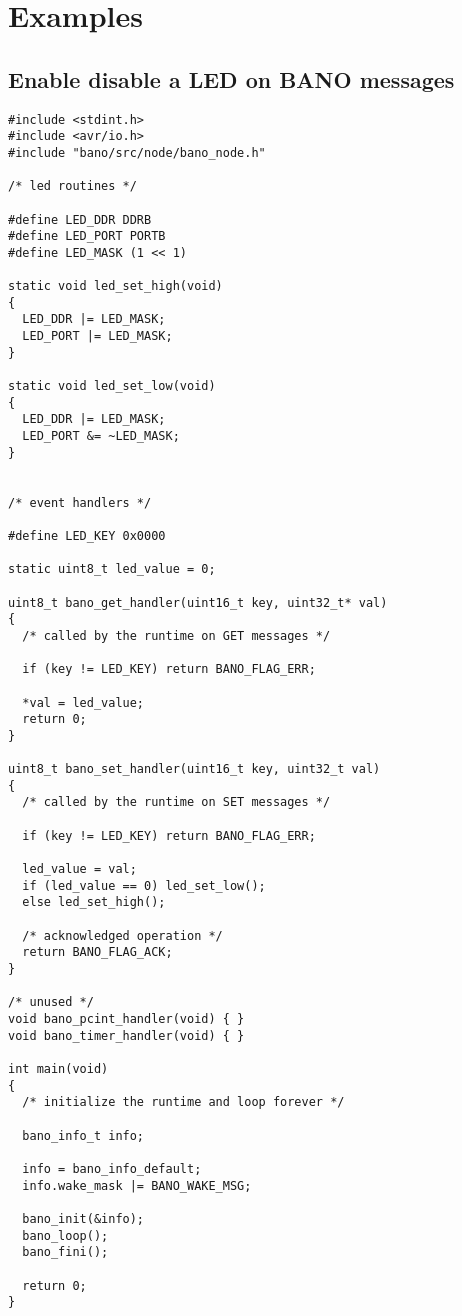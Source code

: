 \documentclass[a4paper, 11pt]{article}
\begin{document}
\clearpage
\section{Examples}

\subsection{Enable disable a LED on BANO messages}
\begin{tiny}
\begin{verbatim}
#include <stdint.h>
#include <avr/io.h>
#include "bano/src/node/bano_node.h"

/* led routines */

#define LED_DDR DDRB
#define LED_PORT PORTB
#define LED_MASK (1 << 1)

static void led_set_high(void)
{
  LED_DDR |= LED_MASK;
  LED_PORT |= LED_MASK;
}

static void led_set_low(void)
{
  LED_DDR |= LED_MASK;
  LED_PORT &= ~LED_MASK;
}


/* event handlers */

#define LED_KEY 0x0000

static uint8_t led_value = 0;

uint8_t bano_get_handler(uint16_t key, uint32_t* val)
{
  /* called by the runtime on GET messages */

  if (key != LED_KEY) return BANO_FLAG_ERR;

  *val = led_value;
  return 0;
}

uint8_t bano_set_handler(uint16_t key, uint32_t val)
{
  /* called by the runtime on SET messages */

  if (key != LED_KEY) return BANO_FLAG_ERR;

  led_value = val;
  if (led_value == 0) led_set_low();
  else led_set_high();

  /* acknowledged operation */
  return BANO_FLAG_ACK;
}

/* unused */
void bano_pcint_handler(void) { }
void bano_timer_handler(void) { }

int main(void)
{
  /* initialize the runtime and loop forever */

  bano_info_t info;

  info = bano_info_default;
  info.wake_mask |= BANO_WAKE_MSG;

  bano_init(&info);
  bano_loop();
  bano_fini();

  return 0;
}

\end{verbatim}
\end{tiny}
\end{document}
